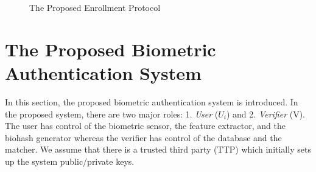 \documentclass[journal]{IEEEtran}
\begin{document}
\begin{figure*}[htp]
\centering
{}
\caption{The Proposed Enrollment Protocol}
\label{enrollment_protocol}
\end{figure*}


\section{The Proposed Biometric Authentication System}

In this section, the proposed biometric authentication system is introduced. In the proposed system, there are two major roles: 1. \emph{User} ({\sffamily $U_i$}) and 2. \emph{Verifier} ({\sffamily V}). The user has control of the biometric sensor, the feature extractor, and the biohash generator whereas the verifier has control of the database and the matcher. We assume that there is a trusted third party (TTP) which initially sets up the system public/private keys.
\end{document}
